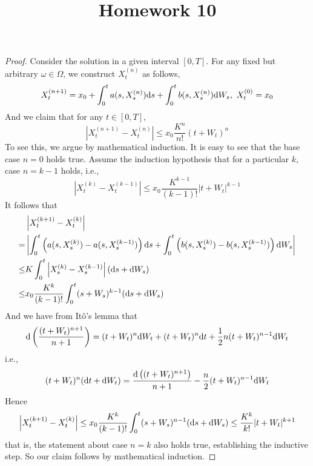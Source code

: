 \documentclass{homework}
\title{Homework 10}
\begin{document}
    \maketitle

    \problem
    \begin{proof}
        Consider the solution in a given interval $[0,T]$.
        For any fixed but arbitrary $\omega\in\Omega$,
        we construct $X_t^{(n)}$ as follows,
        \begin{equation}
            \label{eq:induction formula}
            X_t^{(n+1)}=x_0+\int_0^ta(s,X_s^{(n)})\mathrm d s
            +\int_0^tb(s,X_s^{(n)})\mathrm d W_s,
            \ X_t^{(0)}=x_0
        \end{equation}
        And we claim that for any $t\in[0,T]$,
        \[\left|X_t^{(n+1)}-X_t^{(n)}\right|
        \leq x_0\frac{K^n}{n!}(t+W_t)^{n}\]
        To see this,
        we argue by mathematical induction.
        It is easy to see that the base case $n=0$ holds true.
        Assume the induction hypothesis that for a particular
        $k$, case $n=k-1$ holds, i.e.,
        \[\left|X_t^{(k)}-X_t^{(k-1)}\right|
        \leq x_0\frac{K^{k-1}}{(k-1)!}|t+W_t|^{k-1}\]
        It follows that
        \[\begin{aligned}
            &\left|X_t^{(k+1)}-X_t^{(k)}\right|\\
            =&\left|\int_0^t\left(a(s,X_s^{(k)})-a(s,X_s^{(k-1)})\right)\mathrm d s
            +\int_0^t\left(b(s,X_s^{(k)})-b(s,X_s^{(k-1)})\right)\mathrm d W_s\right|\\
            \leq&K\int_0^t\left|X_s^{(k)}-X_s^{(k-1)}\right|(\mathrm d s+\mathrm d W_s)\\
            \leq&x_0\frac{K^k}{(k-1)!}\int_0^t(s+W_s)^{k-1}(\mathrm d s+\mathrm d W_s)
        \end{aligned}\]
        And we have from It\^o's lemma that
        \[\mathrm d\left(\frac{(t+W_t)^{n+1}}{n+1}\right)
        =(t+W_t)^n\mathrm d W_t+(t+W_t)^n\mathrm d t+\frac{1}{2}n(t+W_t)^{n-1}\mathrm d W_t\]
        i.e.,
        \[(t+W_t)^n(\mathrm d t+\mathrm d W_t)
        =\frac{\mathrm d\left((t+W_t)^{n+1}\right)}{n+1}
        -\frac{n}{2}(t+W_t)^{n-1}\mathrm d W_t\]
        Hence
        \[\left|X_t^{(k+1)}-X_t^{(k)}\right|\leq
        x_0\frac{K^k}{(k-1)!}\int_0^t(s+W_s)^{n-1}(\mathrm d s+\mathrm d W_s)
        \leq\frac{K^k}{k!}|t+W_t|^{k+1}\]
        that is, the statement about case $n=k$ also holds true,
        establishing the inductive step. So our claim follows by
        mathematical induction.


\end{proof}
\end{document}
